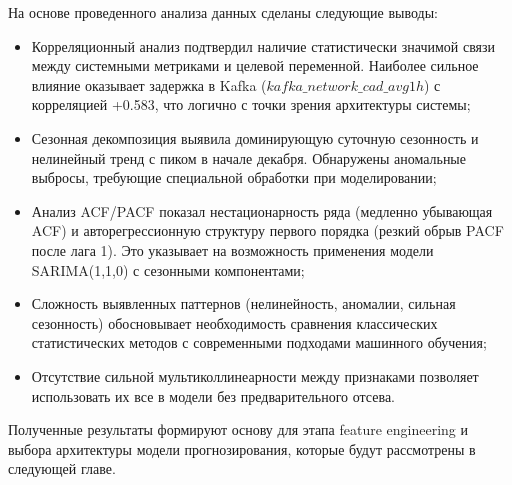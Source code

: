\hspace*{1.25cm}На основе проведенного анализа данных сделаны следующие выводы:

\begin{itemize}
	\item Корреляционный анализ подтвердил наличие статистически значимой связи между системными метриками и целевой переменной. Наиболее сильное влияние оказывает задержка в Kafka ($kafka\_network\_cad\_avg1h$) с корреляцией +0.583, что логично с точки зрения архитектуры системы;
	\item Сезонная декомпозиция выявила доминирующую суточную сезонность и нелинейный тренд с пиком в начале декабря. Обнаружены аномальные выбросы, требующие специальной обработки при моделировании;
	\item Анализ ACF/PACF показал нестационарность ряда (медленно убывающая ACF) и авторегрессионную структуру первого порядка (резкий обрыв PACF после лага 1). Это указывает на возможность применения модели SARIMA(1,1,0) с сезонными компонентами;
	\item Сложность выявленных паттернов (нелинейность, аномалии, сильная сезонность) обосновывает необходимость сравнения классических статистических методов с современными подходами машинного обучения;
	\item Отсутствие сильной мультиколлинеарности между признаками позволяет использовать их все в модели без предварительного отсева.
\end{itemize}

\hspace*{1.25cm}Полученные результаты формируют основу для этапа feature engineering и выбора архитектуры модели прогнозирования, которые будут рассмотрены в следующей главе.

